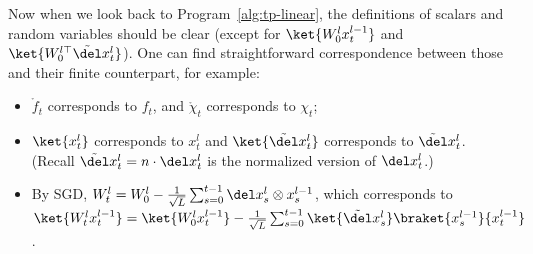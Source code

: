 Now when we look back to Program~\ref{alg:tp-linear}, the definitions of scalars and random variables should be clear (except for $\ket{W_0^l x_t^{l-1}}$ and $\ket{W_0^{l\top} \tilde\del x_t^l}$). One can find straightforward correspondence between those and their finite counterpart, for example: \begin{itemize}
    \item $\mathring f_t$ corresponds to $f_t$, and $\mathring \chi_t$ corresponds to $\chi_t$;
    \item $\ket{x_t^l}$ corresponds to $x_t^l$ and $\ket{\tilde\del x_t^l}$ corresponds to $\tilde\del x_t^l$. (Recall $\tilde\del x_t^l=n\cdot \del x_t^l$ is the normalized version of $\del x_t^l$.)
    \item By SGD, $W_t^l = W_0^l - \frac{1}{\sqrt L}\sum_{s=0}^{t-1} \del x_s^l \otimes x_s^{l-1} $, which corresponds to $\ket{W_t^l x_t^{l-1}} = \ket{W_0^l x_t^{l-1}} - \frac1{\sqrt L} \sum_{s=0}^{t-1} \ket{\tilde\del x_s^{l}} \braket{x_s^{l-1}}{x_t^{l-1}}$.
\end{itemize}

